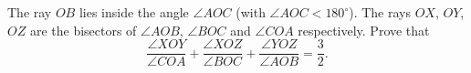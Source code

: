 The ray $OB$ lies inside the angle $\angle AOC$ (with $\angle AOC<180^\circ$). The rays $OX$, $OY$, $OZ$ are the bisectors of $\angle AOB$, $\angle BOC$ and $\angle COA$ respectively. Prove that
\[
\dfrac{\angle XOY}{\angle COA}+\dfrac{\angle XOZ}{\angle BOC}+\dfrac{\angle YOZ}{\angle AOB}=\dfrac{3}{2} .
\]
